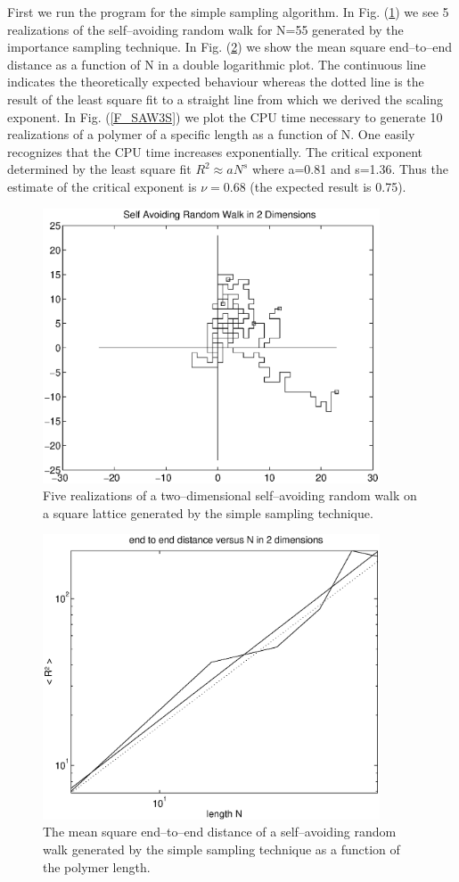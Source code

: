 First we run the program for the simple sampling algorithm.
In Fig. (\ref{F_SAW1S}) we see 5 realizations of the self--avoiding 
random walk for N=55 generated by the importance sampling technique. 
In Fig. (\ref{F_SAW2S}) we show the mean square end--to--end 
distance as a function of N in a double logarithmic plot. The 
continuous line indicates the theoretically expected behaviour
whereas the dotted line is the result of the least square fit to a 
straight line from which we derived the scaling exponent. In 
Fig. (\ref{F_SAW3S}) we plot the CPU time necessary to generate
10 realizations of a polymer of a specific length as a function of 
N. One easily recognizes that the CPU time increases 
exponentially. The critical exponent determined by the least 
square fit $R^2 \approx aN^s$ where a=0.81 and s=1.36.
Thus the estimate of the critical exponent is 
$\nu=0.68$ (the expected result is 0.75).

\begin{figure}
\label{F_SAW1S}
\includegraphics[width=10cm]{./Figures/f_saw1s.eps}
\caption{Five realizations of a two--dimensional self--avoiding 
random walk on a square lattice generated by the simple sampling 
technique.}
\end{figure}

\begin{figure}
\label{F_SAW2S}
\includegraphics[width=10cm]{./Figures/f_saw2s.eps}
\caption{The mean square end--to--end distance of a 
self--avoiding random walk generated by the simple sampling
technique as a function of the polymer length.}
\end{figure}

